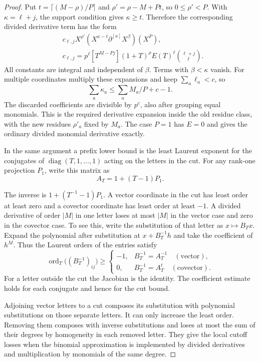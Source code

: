 \begin{proof}
Put \(t=\lceil(M-\rho)/P\rceil\) and \(\rho'=\rho-M+Pt\), so
\(0\le\rho'<P\). With \(\kappa=\ell+j\), the support condition
gives \(\kappa\ge t\). Therefore the corresponding divided
derivative term has the form
\begin{equation}\label{eq:plane-digit-derivative-expansion}
 \begin{aligned}
 &c_{\ell,j}X^{\rho'}
       \left(X^{\kappa-t}\partial^{[\kappa]}X^\beta\right)(X^P),\\
 &c_{\ell,j}=p^\ell[T^{M-Pj}](1+T)^\rho E(T)^\ell
                                      \binom{\ell+j}{\ell}.
 \end{aligned}
\end{equation}
All constants are integral and independent of \(\beta\).
Terms with \(\beta<\kappa\) vanish. For multiple coordinates
multiply these expansions and keep \(\sum_a\ell_a<c\), so
\[
 \sum_a\kappa_a\le\sum_a M_a/P+c-1.
\]
The discarded coefficients
are divisible by \(p^c\), also after grouping equal monomials.
This is the required derivative expansion inside the old residue
class, with the new residues \(\rho'_a\) fixed by \(M_a\).
The case \(P=1\) has \(E=0\) and gives the ordinary divided
monomial derivative exactly.

In the same argument a prefix lower bound is the least Laurent
exponent for the conjugates of \(\operatorname{diag}(T,1,\ldots,1)\)
acting on the letters in the cut. For any rank-one projection
\(P_1\), write this matrix as
\[
 A_T=1+(T-1)P_1.
\]

The inverse is \(1+(T^{-1}-1)P_1\). A vector coordinate in the
cut has least order at least zero and a covector coordinate
has least order at least \(-1\). A divided derivative of
order \(|M|\) in one letter loses at most \(|M|\) in the vector
case and zero in the covector case. To see this, write the
substitution of that letter as \(x\mapsto B_Tx\). Expand the
polynomial after substitution at \(x+B_T^{-1}h\) and take the
coefficient of \(h^M\). Thus the Laurent orders of the entries satisfy
\[
 \operatorname{ord}_T\!\big((B_T^{-1})_{ij}\big)\ge\begin{cases}-1,&B_T^{-1}=A_T^{-1}\quad(\text{vector}),\\0,&B_T^{-1}=A_T^t\quad(\text{covector}).\end{cases}
\]
For a letter
outside the cut the Jacobian is the identity. The coefficient
estimate holds for each conjugate and hence for the cut bound.

Adjoining vector letters to a cut composes its substitution
with polynomial substitutions on those separate letters.
It can only increase the least order. Removing them composes
with inverse substitutions and loses at most the sum of their
degrees by homogeneity in each removed letter.  They give the local cutoff losses
when the binomial approximation is implemented by divided
derivatives and multiplication by monomials of the same degree.
\end{proof}
